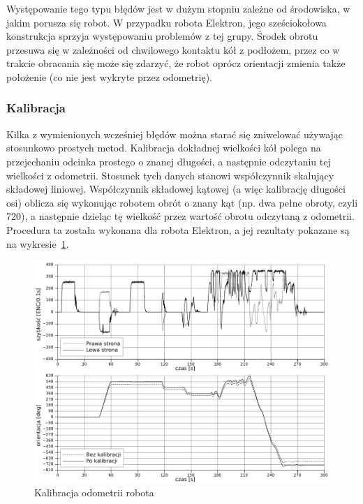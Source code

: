 Występowanie tego typu błędów jest w dużym stopniu zależne od środowiska, w
jakim porusza się robot. W przypadku robota Elektron, jego sześciokołowa
konstrukcja sprzyja występowaniu problemów z tej grupy. Środek obrotu przesuwa
się w zależności od chwilowego kontaktu kół z podłożem, przez co w trakcie
obracania się może się zdarzyć, że robot oprócz orientacji zmienia także
położenie (co nie jest wykryte przez odometrię).

\subsubsection{Kalibracja}

Kilka z wymienionych wcześniej błędów można starać się zniwelować używając
stosunkowo prostych metod. Kalibracja dokładnej wielkości kół polega na
przejechaniu odcinka prostego o znanej długości, a następnie odczytaniu tej
wielkości z odometrii. Stosunek tych danych stanowi współczynnik skalujący
składowej liniowej. Współczynnik składowej kątowej (a więc kalibrację długości
osi) oblicza się wykonując robotem obrót o znany kąt (np. dwa pełne obroty,
czyli 720\textdegree), a następnie dzieląc tę wielkość przez wartość obrotu
odczytaną z odometrii. Procedura ta została wykonana dla robota Elektron, a jej
rezultaty pokazane są na wykresie~\ref{fig:odom_calib}.

\begin{figure}[ht!]
\centering
\includegraphics[width=\textwidth]{../../Common/pomiary/odom_calib_bw}
\caption{Kalibracja odometrii robota}
\label{fig:odom_calib}
\end{figure}

